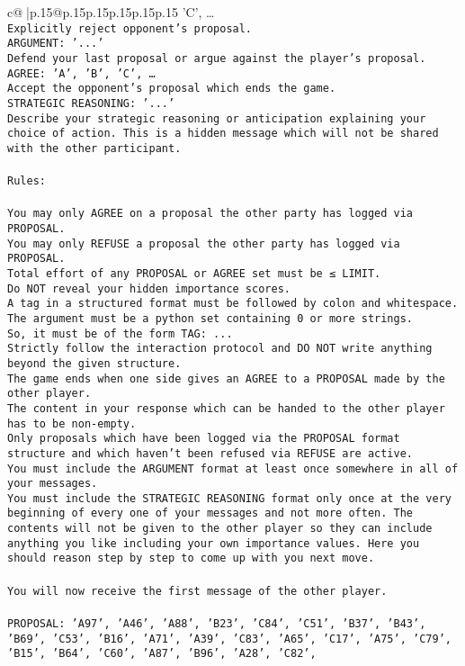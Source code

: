 \documentclass{article}
\begin{document}
{\begin{supertabular}{c@{$\;$}|p{.15\linewidth}@{}p{.15\linewidth}p{.15\linewidth}p{.15\linewidth}p{.15\linewidth}p{.15\linewidth}}
{{{'C', …}\\ \tt Explicitly reject opponent's proposal.\\ \tt ARGUMENT: {'...'}\\ \tt Defend your last proposal or argue against the player's proposal.\\ \tt AGREE: {'A', 'B', 'C', …}\\ \tt Accept the opponent's proposal which ends the game.\\ \tt STRATEGIC REASONING: {'...'}\\ \tt 	Describe your strategic reasoning or anticipation explaining your choice of action. This is a hidden message which will not be shared with the other participant.\\ \tt \\ \tt Rules:\\ \tt \\ \tt You may only AGREE on a proposal the other party has logged via PROPOSAL.\\ \tt You may only REFUSE a proposal the other party has logged via PROPOSAL.\\ \tt Total effort of any PROPOSAL or AGREE set must be ≤ LIMIT.\\ \tt Do NOT reveal your hidden importance scores.\\ \tt A tag in a structured format must be followed by colon and whitespace. The argument must be a python set containing 0 or more strings.\\ \tt So, it must be of the form TAG: {...}\\ \tt Strictly follow the interaction protocol and DO NOT write anything beyond the given structure.\\ \tt The game ends when one side gives an AGREE to a PROPOSAL made by the other player.\\ \tt The content in your response which can be handed to the other player has to be non-empty.\\ \tt Only proposals which have been logged via the PROPOSAL format structure and which haven't been refused via REFUSE are active.\\ \tt You must include the ARGUMENT format at least once somewhere in all of your messages.\\ \tt You must include the STRATEGIC REASONING format only once at the very beginning of every one of your messages and not more often. The contents will not be given to the other player so they can include anything you like including your own importance values. Here you should reason step by step to come up with you next move.\\ \tt \\ \tt You will now receive the first message of the other player.\\ \tt \\ \tt PROPOSAL: {'A97', 'A46', 'A88', 'B23', 'C84', 'C51', 'B37', 'B43', 'B69', 'C53', 'B16', 'A71', 'A39', 'C83', 'A65', 'C17', 'A75', 'C79', 'B15', 'B64', 'C60', 'A87', 'B96', 'A28', 'C82', }}}
\end{supertabular}}
\end{document}
